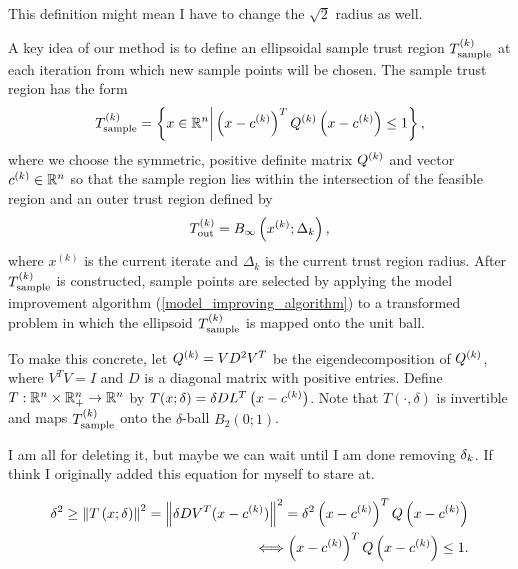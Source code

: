 \documentclass{article}
\begin{document}

\color{magenta}
This definition might mean I have to change the $\sqrt{2}$ radius as well.
\color{black}



A key idea of our method is to define an ellipsoidal sample trust region ${T_{\text{sample}}^{(k)}}$ at each iteration from which new sample points will be chosen.   The sample trust region has the form
\begin{equation}
\label{define_the_sample_region}
{T_{\text{sample}}^{(k)}} = \left\{x \in \mathbb R^n \bigg | \left(x - c^{(k)}\right)^T {Q^{(k)}} \left(x - c^{(k)}\right) \le 1 \right\},
\end{equation}
where we choose the symmetric, positive definite matrix ${Q^{(k)}}$ and vector $c^{(k)} \in \mathbb R^n$ so that
the sample region lies within the intersection of the feasible region and an outer trust region defined by
\begin{equation}
\label{define_outer_trust_region}
{T_{\text{out}}^{(k)}} = B_{\infty}\left(x^{(k)};\Delta_k\right),
\end{equation}
where $x^{(k)}$ is the current iterate and $\Delta_k$ is the current trust region radius.
After  ${T_{\text{sample}}^{(k)}}$ is constructed,  sample points are selected by applying the model improvement algorithm  (\cref{model_improving_algorithm}) 
to a transformed problem in which the ellipsoid ${T_{\text{sample}}^{(k)}}$ is mapped onto the unit ball. 

To make this concrete, let ${Q^{(k)}} = V D^2 V^T$ be the eigendecomposition  of ${Q^{(k)}}$, 
where $V^TV = I$ and $D$ is a diagonal matrix with positive entries.  Define
$T:\mathbb R^n \times \mathbb R^n_+ \rightarrow \mathbb R^n$ by $T(x; \delta) = \delta DL^T\left(x - c^{(k)}\right)$.
Note that  $T(\cdot,\delta)$ is invertible and maps ${T_{\text{sample}}^{(k)}}$ onto the $\delta$-ball
$B_2(0;1)$.


\color{magenta}
I am all for deleting it, but maybe we can wait until I am done removing $\delta_k$.
If think I originally added this equation for myself to stare at.

\begin{align*}
\delta^2 \ge \left\|T\left(x; \delta\right)\right\|^2 = \left\|\delta DV^T(x - c^{(k)})\right \|^2
= \delta^2 \left(x - c^{(k)}\right)^TQ\left(x - c^{(k)}\right) \\
\Longleftrightarrow \left(x - c^{(k)}\right)^TQ\left(x - c^{(k)}\right) \le 1.
\end{align*}
\end{document}
